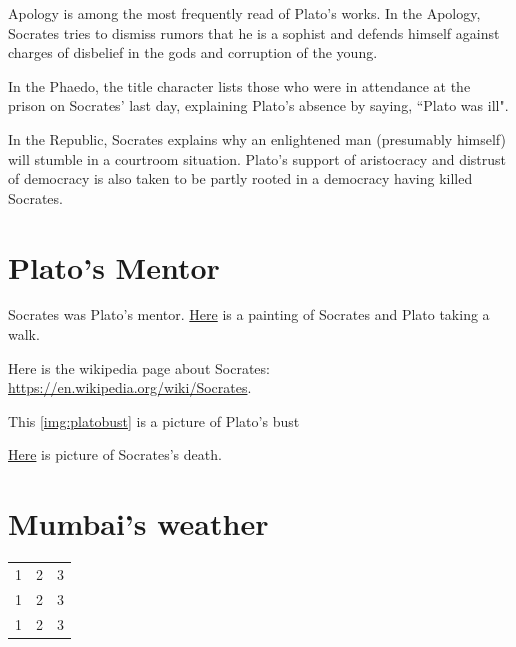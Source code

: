 \documentclass[11pt]{article}
\begin{document}
			\begin{description}[align=left]
				\item[Apology] Apology is among the most frequently read of Plato's works. In the Apology, Socrates tries to dismiss rumors that he is a sophist and defends himself against charges of disbelief in the gods and corruption of the young.
				\item[Phaedo] In the Phaedo, the title character lists those who were in attendance at the prison on Socrates' last day, explaining Plato's absence by saying, ``Plato was ill".
				\item[Republic] In the Republic, Socrates explains why an enlightened man (presumably himself) will stumble in a courtroom situation. Plato's support of aristocracy and distrust of democracy is also taken to be partly rooted in a democracy having killed Socrates.
			\end{description}

	\section{Plato's Mentor}
		Socrates was Plato's mentor. \href{https://classicalwisdom.com/wp-content/uploads/2012/12/plato-socrates.jpg}{Here} is a painting of Socrates and Plato taking a walk.

		Here is the wikipedia page about Socrates: \url{https://en.wikipedia.org/wiki/Socrates}.

		This \ref{img:platobust} is a picture of Plato's bust

		\href{run:./images/death_of_socrates.jpg}{Here} is picture of Socrates's death.

	\section{Mumbai's weather}
		\begin{tabular}{c c c}
			1 & 2 & 3 \\
			1 & 2 & 3 \\
			1 & 2 & 3 \\
		\end{tabular}
		
\end{document}
